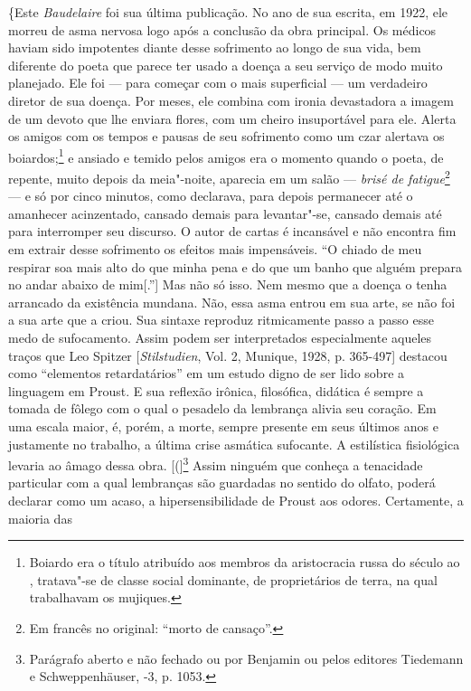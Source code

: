 \{Este \emph{Baudelaire} foi sua última publicação. No ano de sua
escrita, em 1922, ele morreu de asma nervosa logo após a conclusão da
obra principal. Os médicos haviam sido impotentes diante desse
sofrimento ao longo de sua vida, bem diferente do poeta que parece ter
usado a doença a seu serviço de modo muito planejado. Ele foi --- para
começar com o mais superficial --- um verdadeiro diretor de sua doença.
Por meses, ele combina com ironia devastadora a imagem de um devoto que
lhe enviara flores, com um cheiro insuportável para ele. Alerta os
amigos com os tempos e pausas de seu sofrimento como um czar alertava os
boiardos;\footnote{Boiardo era o título atribuído aos membros da
  aristocracia russa do século  ao , tratava"-se de classe social
  dominante, de proprietários de terra, na qual trabalhavam os mujiques. \versal{[N. E.]}}
e ansiado e temido pelos amigos era o momento quando o poeta, de
repente, muito depois da meia"-noite, aparecia em um salão --- \emph{brisé
de fatigue}\footnote{Em francês no original: ``morto de cansaço''. \versal{[N. T.]}}
--- e só por cinco minutos, como declarava, para depois permanecer até o
amanhecer acinzentado, cansado demais para levantar"-se, cansado demais
até para interromper seu discurso. O autor de cartas é incansável e não
encontra fim em extrair desse sofrimento os efeitos mais impensáveis. ``O
chiado de meu respirar soa mais alto do que minha pena e do que um banho
que alguém prepara no andar abaixo de mim{[}.''{]} Mas não só isso. Nem
mesmo que a doença o tenha arrancado da existência mundana. Não, essa
asma entrou em sua arte, se não foi a sua arte que a criou. Sua sintaxe
reproduz ritmicamente passo a passo esse medo de sufocamento. Assim
podem ser interpretados especialmente aqueles traços que Leo Spitzer
{[}\emph{Stilstudien}, Vol. 2, Munique, 1928, p. 365-497{]} destacou como
``elementos retardatários'' em um estudo digno de ser lido sobre a
linguagem em Proust. E sua reflexão irônica, filosófica, didática é
sempre a tomada de fôlego com o qual o pesadelo da lembrança alivia seu
coração. Em uma escala maior, é, porém, a morte, sempre presente em seus
últimos anos e justamente no trabalho, a última crise asmática
sufocante. A estilística fisiológica levaria ao âmago dessa obra. {[}({]}\footnote{Parágrafo aberto e não fechado ou por Benjamin ou pelos
  editores Tiedemann e Schweppenhäuser, -3, p. 1053. \versal{[N. T.]}} Assim
ninguém que conheça a tenacidade particular com a qual lembranças são
guardadas no sentido do olfato, poderá declarar como um acaso, a
hipersensibilidade de Proust aos odores. Certamente, a maioria das
